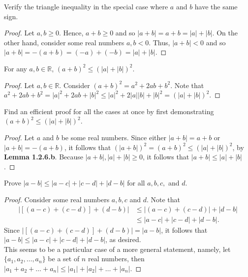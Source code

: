 \documentclass[12pt]{article}
\newcommand{\R}{\mathbb{R}}
\newenvironment{lemma}[2][Lemma]{\begin{trivlist}
		\item[\hskip \labelsep {\bfseries #1}\hskip \labelsep {\bfseries #2.}]}{\end{trivlist}}
\newenvironment{problem}[2][Problem]{\begin{trivlist}
		\item[\hskip \labelsep {\bfseries #1}\hskip \labelsep {\bfseries #2.}]}{\end{trivlist}}
\begin{document}
	\begin{problem}{1.2.6}
		\begin{enumerate}[label=(\alph*)]
			\item Verify the triangle inequality in the special case where $a$ and $b$ have the same sign.
			\begin{proof}
				Let $a,b\geq 0$. Hence, $a+b \geq 0$ and so $|a+b| = a+b = |a|+|b|$. On the other hand, consider some real numbers $a,b<0$. Thus, $|a+b| < 0$ and so $|a+b| = -(a+b) = (-a)+(-b)=|a|+|b|$.
			\end{proof}
			
			\begin{lemma}{1.2.6.b}
				For any $a,b\in \R$, $(a+b)^{2} \leq (|a|+|b|)^{2}$.
				\begin{proof}
					Let $a,b\in \R$. Consider $(a+b)^{2} = a^{2}+2ab+b^{2}$. Note that $a^{2} +2ab + b^{2} = |a|^{2}+2ab+|b|^{2} \leq |a|^{2} +2|a||b| +|b|^{2} = (|a|+|b|)^{2}$.
				\end{proof}
			\end{lemma}
			\item Find an efficient proof for all the cases at once by first demonstrating $(a+b)^{2} \leq (|a|+|b|)^{2}$.
			\begin{proof}
				Let $a$ and $b$ be some real numbers. Since either $|a+b| = a+b$ or $|a+b| = -(a+b)$, it follows that $\left(|a+b|\right)^{2} = (a+b)^{2} \leq \left(|a|+|b|\right)^{2}$, by \textbf{Lemma 1.2.6.b}. Because $|a+b|, |a|+|b| \geq 0$, it follows that $|a+b| \leq |a|+|b|$.
			\end{proof}
			
			\item Prove $|a-b|\leq |a-c|+|c-d|+ |d-b|$ for all $a,b,c,$ and $d$.
			\begin{proof}
				Consider some real numbers $a,b,c$ and $d$. Note that 
				\begin{align*}
					\left|[(a-c)+(c-d)]+(d-b)\right| &\leq |(a-c)+(c-d)|+|d-b|\\
					&\leq  |a-c|+|c-d|+|d-b|.
				\end{align*}
			Since $\left|[(a-c)+(c-d)]+(d-b)\right| = |a-b|$, it follows that $|a-b|\leq  |a-c|+|c-d|+|d-b|$, as desired.\\
			
			This seems to be a particular case of a more general statement, namely, let $\{a_{1},a_{2},\ldots,a_{n}\}$ be a set of $n$ real numbers, then $|a_{1}+a_{2}+\ldots+a_{n}| \leq |a_{1}|+|a_{2}|+\ldots+|a_{n}|$.
			\end{proof}
			

\end{enumerate}
\end{problem}
\end{document}
